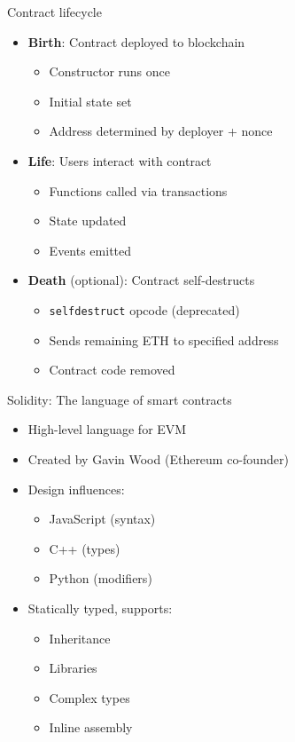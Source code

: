 \documentclass[aspectratio=169, lualatex, handout]{beamer}
\begin{document}
\begin{frame}{Contract lifecycle}
	\begin{itemize}
		\item \textbf{Birth}: Contract deployed to blockchain
		      \begin{itemize}
			      \item Constructor runs once
			      \item Initial state set
			      \item Address determined by deployer + nonce
		      \end{itemize}
		\item \textbf{Life}: Users interact with contract
		      \begin{itemize}
			      \item Functions called via transactions
			      \item State updated
			      \item Events emitted
		      \end{itemize}
		\item \textbf{Death} (optional): Contract self-destructs
		      \begin{itemize}
			      \item \texttt{selfdestruct} opcode (deprecated)
			      \item Sends remaining ETH to specified address
			      \item Contract code removed
		      \end{itemize}
	\end{itemize}
\end{frame}

\begin{frame}{Solidity: The language of smart contracts}
	\begin{itemize}
		\item High-level language for EVM
		\item Created by Gavin Wood (Ethereum co-founder)
		\item Design influences:
		      \begin{itemize}
			      \item JavaScript (syntax)
			      \item C++ (types)
			      \item Python (modifiers)
		      \end{itemize}
		\item Statically typed, supports:
		      \begin{itemize}
			      \item Inheritance
			      \item Libraries
			      \item Complex types
			      \item Inline assembly
		      \end{itemize}
	\end{itemize}
\end{frame}
\end{document}
